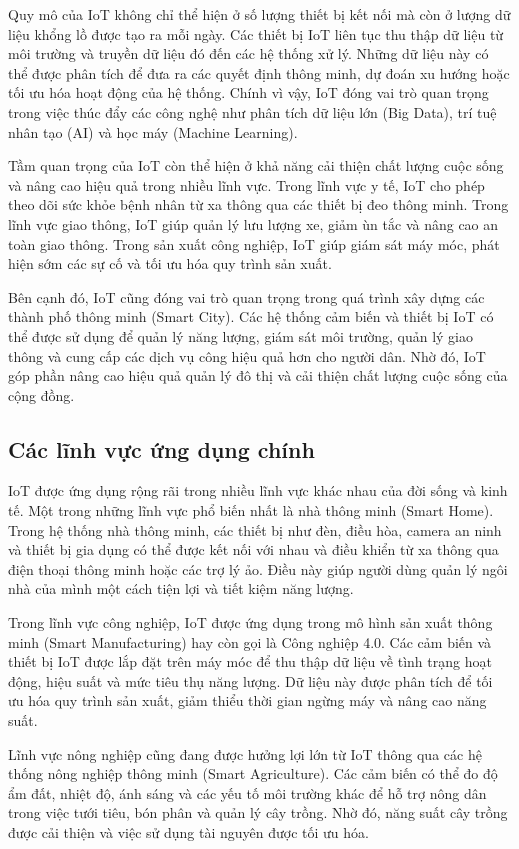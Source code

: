 Quy mô của IoT không chỉ thể hiện ở số lượng thiết bị kết nối mà còn ở lượng dữ liệu khổng lồ được tạo ra mỗi ngày. Các thiết bị IoT liên tục thu thập dữ liệu từ môi trường và truyền dữ liệu đó đến các hệ thống xử lý. Những dữ liệu này có thể được phân tích để đưa ra các quyết định thông minh, dự đoán xu hướng hoặc tối ưu hóa hoạt động của hệ thống. Chính vì vậy, IoT đóng vai trò quan trọng trong việc thúc đẩy các công nghệ như phân tích dữ liệu lớn (Big Data), trí tuệ nhân tạo (AI) và học máy (Machine Learning).

Tầm quan trọng của IoT còn thể hiện ở khả năng cải thiện chất lượng cuộc sống và nâng cao hiệu quả trong nhiều lĩnh vực. Trong lĩnh vực y tế, IoT cho phép theo dõi sức khỏe bệnh nhân từ xa thông qua các thiết bị đeo thông minh. Trong lĩnh vực giao thông, IoT giúp quản lý lưu lượng xe, giảm ùn tắc và nâng cao an toàn giao thông. Trong sản xuất công nghiệp, IoT giúp giám sát máy móc, phát hiện sớm các sự cố và tối ưu hóa quy trình sản xuất.

Bên cạnh đó, IoT cũng đóng vai trò quan trọng trong quá trình xây dựng các thành phố thông minh (Smart City). Các hệ thống cảm biến và thiết bị IoT có thể được sử dụng để quản lý năng lượng, giám sát môi trường, quản lý giao thông và cung cấp các dịch vụ công hiệu quả hơn cho người dân. Nhờ đó, IoT góp phần nâng cao hiệu quả quản lý đô thị và cải thiện chất lượng cuộc sống của cộng đồng.
\subsection{Các lĩnh vực ứng dụng chính}
IoT được ứng dụng rộng rãi trong nhiều lĩnh vực khác nhau của đời sống và kinh tế. Một trong những lĩnh vực phổ biến nhất là nhà thông minh (Smart Home). Trong hệ thống nhà thông minh, các thiết bị như đèn, điều hòa, camera an ninh và thiết bị gia dụng có thể được kết nối với nhau và điều khiển từ xa thông qua điện thoại thông minh hoặc các trợ lý ảo. Điều này giúp người dùng quản lý ngôi nhà của mình một cách tiện lợi và tiết kiệm năng lượng.

Trong lĩnh vực công nghiệp, IoT được ứng dụng trong mô hình sản xuất thông minh (Smart Manufacturing) hay còn gọi là Công nghiệp 4.0. Các cảm biến và thiết bị IoT được lắp đặt trên máy móc để thu thập dữ liệu về tình trạng hoạt động, hiệu suất và mức tiêu thụ năng lượng. Dữ liệu này được phân tích để tối ưu hóa quy trình sản xuất, giảm thiểu thời gian ngừng máy và nâng cao năng suất.

Lĩnh vực nông nghiệp cũng đang được hưởng lợi lớn từ IoT thông qua các hệ thống nông nghiệp thông minh (Smart Agriculture). Các cảm biến có thể đo độ ẩm đất, nhiệt độ, ánh sáng và các yếu tố môi trường khác để hỗ trợ nông dân trong việc tưới tiêu, bón phân và quản lý cây trồng. Nhờ đó, năng suất cây trồng được cải thiện và việc sử dụng tài nguyên được tối ưu hóa.

